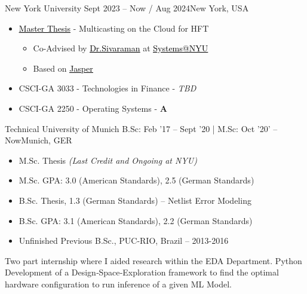 \documentclass[10pt,a4paper,ragged2e,withhyper]{altacv}
\begin{document}
\begin{paracol}{2}

        {New York University}
        {Sept 2023 -- Now / Aug 2024}{New York, USA}
\begin{itemize}
\item \href{https://github.com/duclos-cavalcanti/master-arbeit}{{\textcolor{black}{\underline{Master Thesis}}}} - Multicasting on the Cloud for HFT 
    \begin{itemize}
        \item Co-Advised by \href{https://anirudhsk.github.io/}{{\textcolor{black}{\underline{Dr.Sivaraman}}}} at \href{https://news.cs.nyu.edu/}{{\textcolor{black}{\underline{Systems@NYU}}}}
        \item Based on \href{https://arxiv.org/abs/2402.09527}{{\textcolor{black}{\underline{Jasper}}}}
    \end{itemize}
\item CSCI-GA 3033  - Technologies in Finance - \textit{TBD}
\item CSCI-GA 2250  - Operating Systems - \textbf{A}
\end{itemize}

\divider

        {Technical University of Munich}
        {B.Sc: Feb '17 -- Sept '20 | M.Sc: Oct '20' -- Now}{Munich, GER}
\begin{itemize}
\item M.Sc. Thesis \textit{(Last Credit and Ongoing at NYU)}
\item M.Sc. GPA: 3.0 (American Standards), 2.5 (German Standards) 
\item B.Sc. Thesis, 1.3 (German Standards) -- Netlist Error Modeling
\item B.Sc. GPA: 3.1 (American Standards), 2.2 (German Standards)
\item Unfinished Previous B.Sc., PUC-RIO, Brazil -- 2013-2016
\end{itemize}
\divider


Two part internship where I aided research within the EDA Department. Python Development of a Design‑Space‑Exploration 
framework to find the optimal hardware configuration to run inference of a given ML Model.


\end{paracol}
\end{document}
